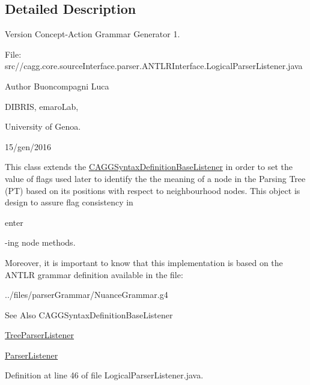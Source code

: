 \subsection{Detailed Description}
\begin{DoxyVersion}{Version}
Concept-\/\-Action Grammar Generator 1. \par
 File\-: src//cagg.core.\-source\-Interface.\-parser.\-A\-N\-T\-L\-R\-Interface.\-Logical\-Parser\-Listener.\-java \par

\end{DoxyVersion}
\begin{DoxyAuthor}{Author}
Buoncompagni Luca \par
 D\-I\-B\-R\-I\-S, emaro\-Lab,\par
 University of Genoa. \par
 15/gen/2016 \par

\end{DoxyAuthor}


This class extends the \hyperlink{}{C\-A\-G\-G\-Syntax\-Definition\-Base\-Listener} in order to set the value of flags used later to identify the the meaning of a node in the Parsing Tree (P\-T) based on its positions with respect to neighbourhood nodes. This object is design to assure flag consistency in
\begin{DoxyCode}
enter 
\end{DoxyCode}
 -\/ing node methods.\par


Moreover, it is important to know that this implementation is based on the A\-N\-T\-L\-R grammar definition available in the file\-: 
\begin{DoxyCode}
../files/parserGrammar/NuanceGrammar.g4 
\end{DoxyCode}
 

\begin{DoxySeeAlso}{See Also}
C\-A\-G\-G\-Syntax\-Definition\-Base\-Listener 

\hyperlink{classit_1_1emarolab_1_1cagg_1_1core_1_1language_1_1parser_1_1ANTLRInterface_1_1TreeParserListener}{Tree\-Parser\-Listener} 

\hyperlink{classit_1_1emarolab_1_1cagg_1_1core_1_1language_1_1parser_1_1ParserListener}{Parser\-Listener} 
\end{DoxySeeAlso}


Definition at line 46 of file Logical\-Parser\-Listener.\-java.




